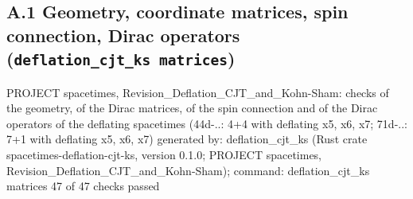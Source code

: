 \documentclass[
  10pt,
]{article}
\newenvironment{Shaded}{}{}
\newcommand{\NormalTok}[1]{#1}
\begin{document}
\hypertarget{a.1-geometry-coordinate-matrices-spin-connection-dirac-operators-deflation_cjt_ks-matrices}{%
\subsection{\texorpdfstring{A.1 Geometry, coordinate matrices, spin
connection, Dirac operators
(\texttt{deflation\_cjt\_ks\ matrices})}{A.1 Geometry, coordinate matrices, spin connection, Dirac operators (deflation\_cjt\_ks matrices)}}\label{a.1-geometry-coordinate-matrices-spin-connection-dirac-operators-deflation_cjt_ks-matrices}}

\begin{Shaded}
\begin{Highlighting}[]
\NormalTok{PROJECT spacetimes, Revision\_Deflation\_CJT\_and\_Kohn{-}Sham: checks of the geometry, of the Dirac matrices, of the spin connection and of the Dirac operators of the deflating spacetimes (44d{-}..: 4+4 with deflating x5, x6, x7; 71d{-}..: 7+1 with deflating x5, x6, x7)}
\NormalTok{generated by: deflation\_cjt\_ks (Rust crate spacetimes{-}deflation{-}cjt{-}ks, version 0.1.0; PROJECT spacetimes, Revision\_Deflation\_CJT\_and\_Kohn{-}Sham); command: deflation\_cjt\_ks matrices}
\NormalTok{47 of 47 checks passed}


\end{Highlighting}
\end{Shaded}
\end{document}
